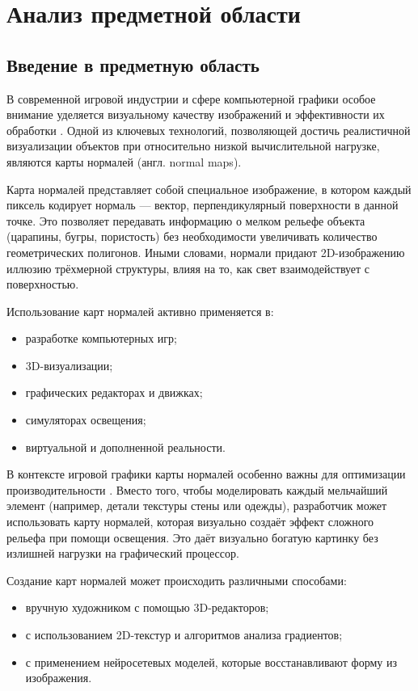 \section{Анализ предметной области}
\subsection{Введение в предметную область}

В современной игровой индустрии и сфере компьютерной графики особое внимание уделяется визуальному качеству изображений и эффективности их обработки \cite{gambetta2021}. Одной из ключевых технологий, позволяющей достичь реалистичной визуализации объектов при относительно низкой вычислительной нагрузке, являются карты нормалей (англ. normal maps).

Карта нормалей представляет собой специальное изображение, в котором каждый пиксель кодирует нормаль — вектор, перпендикулярный поверхности в данной точке. Это позволяет передавать информацию о мелком рельефе объекта (царапины, бугры, пористость) без необходимости увеличивать количество геометрических полигонов. Иными словами, нормали придают 2D-изображению иллюзию трёхмерной структуры, влияя на то, как свет взаимодействует с поверхностью.

Использование карт нормалей активно применяется в:
\begin{itemize}
	\item разработке компьютерных игр;
	\item 3D-визуализации;
	\item графических редакторах и движках;
	\item симуляторах освещения;
	\item виртуальной и дополненной реальности.
\end{itemize}

В контексте игровой графики карты нормалей особенно важны для оптимизации производительности \cite{lukacs2020}. Вместо того, чтобы моделировать каждый мельчайший элемент (например, детали текстуры стены или одежды), разработчик может использовать карту нормалей, которая визуально создаёт эффект сложного рельефа при помощи освещения. Это даёт визуально богатую картинку без излишней нагрузки на графический процессор.

Создание карт нормалей может происходить различными способами:
\begin{itemize}
	\item вручную художником с помощью 3D-редакторов;
	\item с использованием 2D-текстур и алгоритмов анализа градиентов;
	\item с применением нейросетевых моделей, которые восстанавливают форму из изображения.
\end{itemize}

